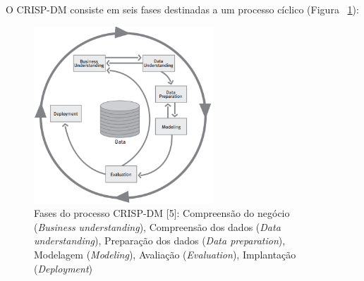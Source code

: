 O CRISP-DM consiste em seis fases destinadas a um processo cíclico (Figura ~\ref{fig:crisp-dm}):

\begin{figure}
  \centering
  \includegraphics[width=0.6\textwidth]{crisp-dm}%
  \caption{Fases do processo CRISP-DM [5]: Compreensão do negócio (\textit{Business understanding}), Compreensão dos dados (\textit{Data understanding}), Preparação dos dados (\textit{Data preparation}), Modelagem (\textit{Modeling}), Avaliação (\textit{Evaluation}), Implantação (\textit{Deployment})}
  \label{fig:crisp-dm}
\end{figure}

